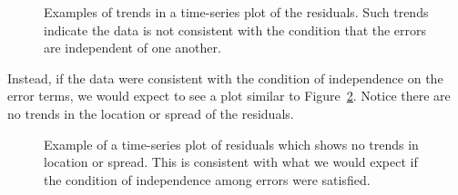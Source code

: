 \documentclass[
  letterpaper,
  DIV=11,
  numbers=noendperiod]{scrreprt}
\theoremstyle{plain}
\theoremstyle{definition}
\theoremstyle{definition}
\theoremstyle{remark}
\begin{document}
\begin{figure}


\caption{\label{fig-regassessment-independence-violations}Examples of
trends in a time-series plot of the residuals. Such trends indicate the
data is not consistent with the condition that the errors are
independent of one another.}

\end{figure}%

Instead, if the data were consistent with the condition of independence
on the error terms, we would expect to see a plot similar to
Figure~\ref{fig-regassessment-independence-reasonable}. Notice there are
no trends in the location or spread of the residuals.

\begin{figure}


\caption{\label{fig-regassessment-independence-reasonable}Example of a
time-series plot of residuals which shows no trends in location or
spread. This is consistent with what we would expect if the condition of
independence among errors were satisfied.}

\end{figure}%
\end{document}
